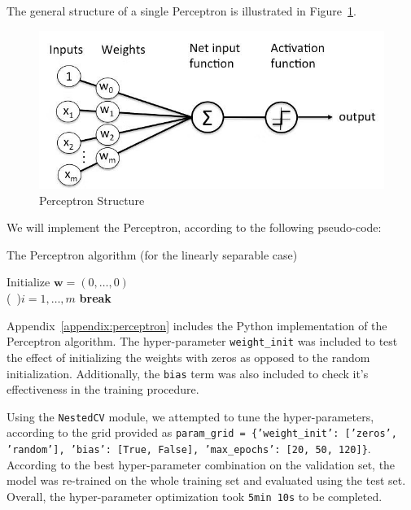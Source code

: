 The general structure of a single Perceptron is illustrated in Figure~\ref{fig:perceptron}.

\begin{figure}[h]
    \centering
    \includegraphics[width=0.7\linewidth]{images/perceptron.png}
    \caption{Perceptron Structure}
    \label{fig:perceptron}
\end{figure} \vspace{10pt}

We will implement the Perceptron, according to the following pseudo-code:

\begin{algorithm}[H]
    \SetAlgoLined
    \DontPrintSemicolon
    \caption{The Perceptron algorithm (for the linearly separable case)} \vspace{4pt}
    Initialize $\boldsymbol{w} = (0, \dots, 0)$\\
     {  
        \For(\ ){$i = 1, \dots, m$}{
        }
         {
            \textbf{break}
        } 
   }
\end{algorithm}\vspace{4pt}
        
Appendix~\ref{appendix:perceptron} includes the Python implementation of the Perceptron algorithm. The hyper-parameter \texttt{weight\_init} was included to test the effect of initializing the weights with zeros as opposed to the random initialization. Additionally, the \texttt{bias} term was also included to check it's effectiveness in the training procedure.

Using the \texttt{NestedCV} module, we attempted to tune the hyper-parameters, according to the grid provided as \texttt{param\_grid = \{'weight\_init': ['zeros', 'random'], 'bias': [True, False], 'max\_epochs': [20, 50, 120]\}}. According to the best hyper-parameter combination on the validation set, the model was re-trained on the whole training set and evaluated using the test set. Overall, the hyper-parameter optimization took \texttt{5min 10s} to be completed.

